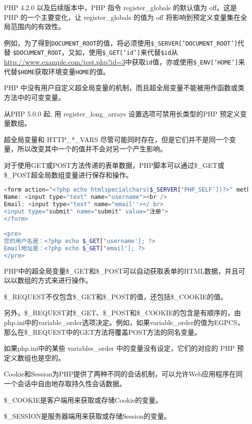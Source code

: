 PHP 4.2.0 以及后续版本中，PHP 指令 register\_globals 的默认值为 off。这是 PHP 的一个主要变化，让 register\_globals 的值为 off 将影响到预定义变量集在全局范围内的有效性。

例如，为了得到\texttt{DOCUMENT\_ROOT}的值，将必须使用\texttt{\$\_SERVER['DOCUMENT\_ROOT']}代替 \texttt{\$DOCUMENT\_ROOT}，又如，使用\texttt{\$\_GET['id']}来代替\texttt{\$id}从\url{http://www.example.com/test.php?id=3}中获取\texttt{id}值，亦或使用\texttt{\$\_ENV['HOME']}来代替\texttt{\$HOME}获取环境变量\texttt{HOME}的值。



PHP 中没有用户自定义超全局变量的机制，而且超全局变量不能被用作函数或类方法中的可变变量。


从PHP 5.0.0 起, 用 register\_long\_arrays 设置选项可禁用长类型的PHP 预定义变量数组。

超全局变量和 HTTP\_*\_VARS 尽管可能同时存在，但是它们并不是同一个变量，所以改变其中一个的值并不会对另一个产生影响。


对于使用GET或POST方法传递的表单数据，PHP脚本可以通过\$\_GET或\$\_POST超全局数组变量进行保存和操作。

\begin{lstlisting}[language=PHP]
<form action="<?php echo htmlspecialchars($_SERVER['PHP_SELF'])?>" method="get">
Name: <input type="text" name="username"><br />
Email: <input type="text" name="email''></ br>
<input type="submit" name="submit" value="注册">
</form>

<pre>
您的用户名是：<?php echo $_GET['username']; ?>
Email地址是：<?php echo $_GET['email']; ?>
</pre>
\end{lstlisting}




PHP中的超全局变量\$\_GET和\$\_POST可以自动获取表单的HTML数据，并且可以以数组的方式来进行操作。

\$\_REQUEST不仅包含\$\_GET和\$\_POST的值，还包括\$\_COOKIE的值。

另外，\$\_REQUEST对\$\_GET、\$\_POST和\$\_COOKIE的包含是有顺序的，由php.ini中的variable\_order选项决定。例如，如果variable\_order的值为EGPCS，那么在\$\_REQUEST中的GET方法将覆盖POST方法的同名变量。

如果php.ini中的某些 variables\_order 中的变量没有设定，它们的对应的 PHP 预定义数组也是空的。

Cookie和Session为PHP提供了两种不同的会话机制，可以允许Web应用程序在同一个会话中自由地存取持久性会话数据。

\begin{compactitem}
\item \$\_COOKIE是客户端用来获取或存储Cookie的变量。
\item \$\_SESSION是服务器端用来获取或存储Session的变量。
\end{compactitem}




